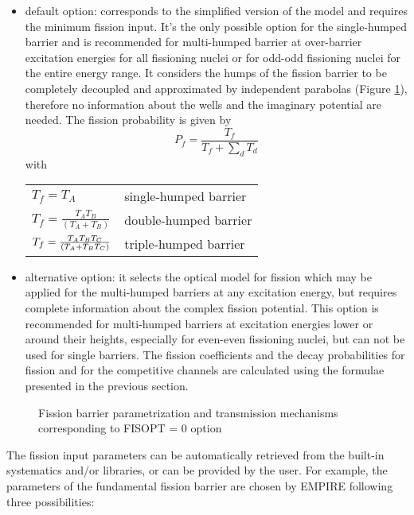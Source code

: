 \begin{itemize}
\item default option: corresponds to the simplified version of the model and
requires the minimum fission input. It's the only possible option for the
single-humped barrier and is recommended for multi-humped barrier at
over-barrier excitation energies for all fissioning nuclei or for odd-odd
fissioning nuclei for the entire energy range. It considers the humps of the
fission barrier to be completely decoupled and approximated by independent
parabolas (Figure \ref{cap:Fission-barrier-parametrization-0}), therefore no
information about the wells and the imaginary potential are needed. The
fission probability is given by
\begin{equation}
P_{f}=\frac{T_{f}}{T_{f}+\sum_{d}T_{d}}
\end{equation}
with\newline
\begin{tabular}{ll}
$T_{f}=T_{A}$ & single-humped barrier\tabularnewline $T_{f}=\frac{T_{A}T_{B}%
}{(T_{A}+T_{B})}$ & double-humped barrier\tabularnewline $T_{f}=\frac{%
T_{A}T_{B}T_{C}}{(T_{A}+T_{B}T_{C})}$ & triple-humped barrier \tabularnewline%
\end{tabular}

\item alternative option: it selects the optical model for fission which may
be applied for the multi-humped barriers at any excitation energy, but
requires complete information about the complex fission potential. This
option is recommended for multi-humped barriers at excitation energies lower
or around their heights, especially for even-even fissioning nuclei, but can
not be used for single barriers. The fission coefficients and the decay
probabilities for fission and for the competitive channels are calculated
using the formulae presented in the previous section.
\end{itemize}

\begin{figure}[tp]
\caption{Fission barrier parametrization and transmission mechanisms
corresponding to FISOPT = 0 option}
\label{cap:Fission-barrier-parametrization-0}
\end{figure}
The fission input parameters can be automatically retrieved from the
built-in systematics and/or libraries, or can be provided by the user. For
example, the parameters of the fundamental fission barrier are chosen by
EMPIRE following three possibilities:

